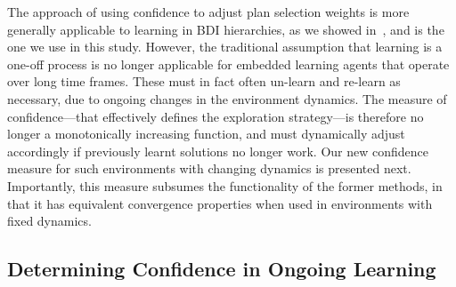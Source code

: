 The approach of using confidence to adjust plan selection weights is more generally applicable to learning in BDI hierarchies, as we showed in~\cite{singh10:extending,singh10:learning}, and is the one we use in this study. However, the traditional assumption that learning is a one-off process is no longer applicable for embedded learning agents that operate over long time frames. These must in fact often un-learn and re-learn as necessary, due to ongoing changes in the environment dynamics. The measure of confidence---that effectively defines the exploration strategy---is therefore no longer a monotonically increasing function, and must dynamically adjust accordingly if previously learnt solutions no longer work. Our new confidence measure for such environments with changing dynamics is presented next. 
Importantly, this measure subsumes the functionality of the former methods, in that it has equivalent convergence properties when used in environments with fixed dynamics. 

\subsection{Determining Confidence in Ongoing Learning}\label{sec:confidence}

\newcommand{\ds}{\zeta}
\newcommand{\app}{\mathname{app}}
\newcommand{\stable}{\mathname{stable}}


